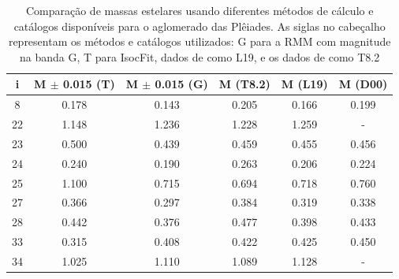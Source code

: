 \begin{table}[htbp]
\centering
\caption[Resultados de massas estelares para as Plêiades]{Comparação de massas estelares usando diferentes métodos de cálculo e catálogos disponíveis para o aglomerado das Plêiades. As siglas no cabeçalho representam os métodos e catálogos utilizados: G para a RMM com magnitude na banda G, T para IsocFit, dados de  como L19, e os dados de   como T8.2}
\label{tab:ple_massas}
\begin{tabular}{cccccc}
\hline
{i} & {M $\pm$ 0.015 (T)} & {M $\pm$ 0.015 (G)} & {M (T8.2)} & {M (L19)} & {M (D00)} \\ \hline
        8   & 0.178 & 0.143 & 0.205 & 0.166 & 0.199 \\
		22  & 1.148 & 1.236 & 1.228 & 1.259 & - \\
		23  & 0.500 & 0.439 & 0.459 & 0.455 & 0.456 \\
		24  & 0.240 & 0.190 & 0.263 & 0.206 & 0.224 \\
		25  & 1.100 & 0.715 & 0.694 & 0.718 & 0.760 \\
		27  & 0.366 & 0.297 & 0.384 & 0.319 & 0.338 \\
		28  & 0.442 & 0.376 & 0.477 & 0.398 & 0.433 \\
		33  & 0.315 & 0.408 & 0.422 & 0.425 & 0.450 \\
		34  & 1.025 & 1.110 & 1.089 & 1.128 & - \\
\hline
\end{tabular}
\end{table}
